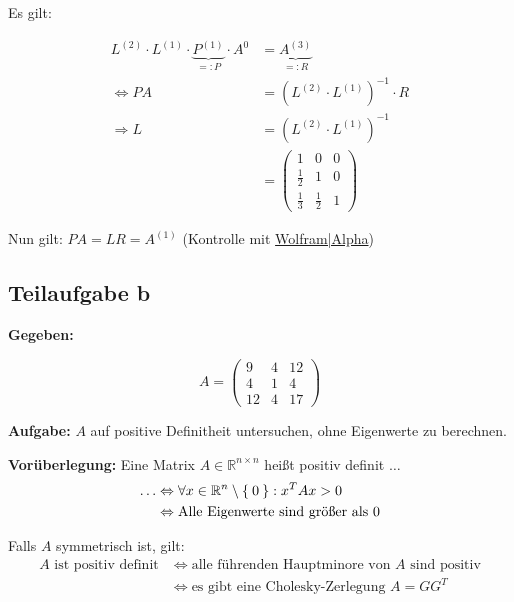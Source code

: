 Es gilt:

\begin{align}
	L^{(2)} \cdot L^{(1)} \cdot \underbrace{P^{(1)}}_{=: P} \cdot A^{0} &= \underbrace{A^{(3)}}_{=: R}\\
	\Leftrightarrow P A &= (L^{(2)} \cdot L^{(1)})^{-1} \cdot R \\
	\Rightarrow L &= (L^{(2)} \cdot L^{(1)})^{-1}\\
	&= \begin{pmatrix}
		1 & 0 & 0\\
		\frac{1}{2} & 1 & 0\\
		\frac{1}{3} & \frac{1}{2} & 1
	\end{pmatrix}
\end{align}

Nun gilt: $P A = L R = A^{(1)}$ (Kontrolle mit \href{http://www.wolframalpha.com/input/?i=%7B%7B1%2C0%2C0%7D%2C%7B0.5%2C1%2C0%7D%2C%7B1%2F3%2C0.5%2C1%7D%7D*%7B%7B6%2C6%2C6%7D%2C%7B0%2C12%2C10%7D%2C%7B0%2C0%2C12%7D%7D}{Wolfram|Alpha})

\subsection*{Teilaufgabe b}

\textbf{Gegeben:}

\[A = 
\begin{pmatrix}
    9 & 4 & 12 \\
    4 & 1  & 4 \\
   12 & 4  & 17
\end{pmatrix}\]

\textbf{Aufgabe:} $A$ auf positive Definitheit untersuchen, ohne Eigenwerte zu berechnen.

\textbf{Vorüberlegung:}
Eine Matrix $A \in \mathbb{R}^{n \times n}$ heißt positiv definit $\dots$
\begin{align*}
  \dots & \Leftrightarrow \forall x \in \mathbb{R}^n \setminus \Set{0}: x^T A x > 0\\
	& \Leftrightarrow \text{Alle Eigenwerte sind größer als 0}
\end{align*}

Falls $A$ symmetrisch ist, gilt:
\begin{align*}
 \text{$A$ ist positiv definit} & \Leftrightarrow \text{alle führenden Hauptminore von $A$ sind positiv}\\
	& \Leftrightarrow \text{es gibt eine Cholesky-Zerlegung $A=GG^T$}\\
\end{align*}

